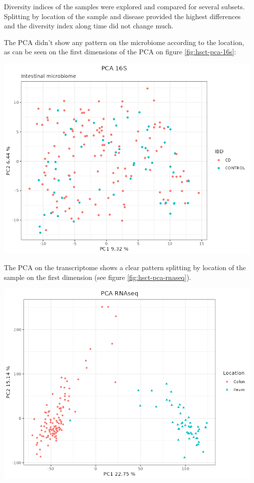 \documentclass[
  12pt,
  a4paper,
  twoside,
  openright]{book}
\let\origfigure\figure
\let\endorigfigure\endfigure
\renewenvironment{figure}[1][2] {
    \expandafter\origfigure\expandafter[!ht]
} {
    \endorigfigure
}
\begin{document}
Diversity indices of the samples were explored and compared for several subsets.
Splitting by location of the sample and disease provided the highest differences and the diversity index along time did not change much.

The PCA didn't show any pattern on the microbiome according to the location, as can be seen on the first dimensions of the PCA on figure \ref{fig:hsct-pca-16s}:

\begin{figure}
\includegraphics[width=1\linewidth]{images/HSCT_PCA_16S} \caption[PCA of 16S data of HSCT dataset.]{PCA of the 16S data of the HSCT dataset. Samples colored by location of the segment. There are no clear patterns according to the location.}\label{fig:hsct-pca-16s}
\end{figure}

The PCA on the transcriptome shows a clear pattern splitting by location of the sample on the first dimension (see figure \ref{fig:hsct-pca-rnaseq}).

\begin{figure}
\includegraphics[width=1\linewidth]{images/HSCT_PCA_RNAseq} \caption[PCA of RNAseq data of HSCT dataset.]{PCA of the RNAseq data of the HSCT dataset. Samples colored by location of the segment. The samples separate according to the location.}\label{fig:hsct-pca-rnaseq}
\end{figure}
\end{document}
